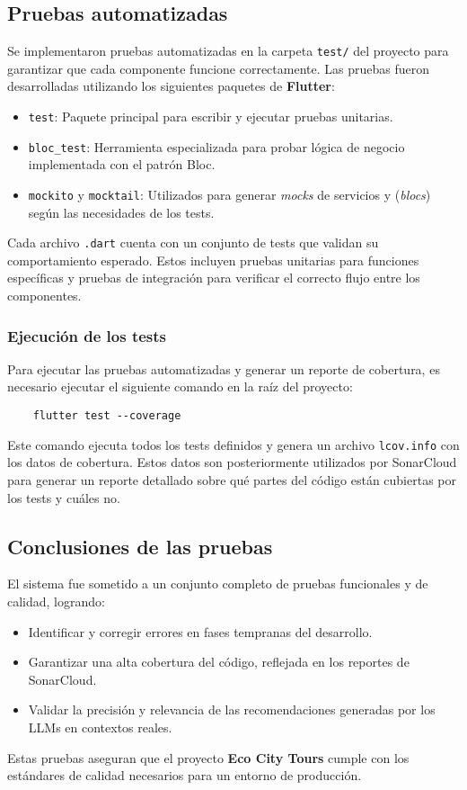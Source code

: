 \subsection{Pruebas automatizadas}

Se implementaron pruebas automatizadas en la carpeta \texttt{test/} del proyecto para garantizar que cada componente funcione correctamente. Las pruebas fueron desarrolladas utilizando los siguientes paquetes de \textbf{Flutter}:

\begin{itemize}
	\item \texttt{test}: Paquete principal para escribir y ejecutar pruebas unitarias.
	\item \texttt{bloc\_test}: Herramienta especializada para probar lógica de negocio implementada con el patrón Bloc.
	\item \texttt{mockito} y \texttt{mocktail}: Utilizados para generar \textit{mocks} de servicios y (\textit{blocs}) según las necesidades de los tests.
\end{itemize}

Cada archivo \texttt{.dart} cuenta con un conjunto de tests que validan su comportamiento esperado. Estos incluyen pruebas unitarias para funciones específicas y pruebas de integración para verificar el correcto flujo entre los componentes.

\subsubsection{Ejecución de los tests}

Para ejecutar las pruebas automatizadas y generar un reporte de cobertura, es necesario ejecutar el siguiente comando en la raíz del proyecto:
\begin{verbatim}
	flutter test --coverage
\end{verbatim}

Este comando ejecuta todos los tests definidos y genera un archivo \texttt{lcov.info} con los datos de cobertura. Estos datos son posteriormente utilizados por SonarCloud para generar un reporte detallado sobre qué partes del código están cubiertas por los tests y cuáles no.

\subsection{Conclusiones de las pruebas}

El sistema fue sometido a un conjunto completo de pruebas funcionales y de calidad, logrando:
\begin{itemize}
	\item Identificar y corregir errores en fases tempranas del desarrollo.
	\item Garantizar una alta cobertura del código, reflejada en los reportes de SonarCloud.
	\item Validar la precisión y relevancia de las recomendaciones generadas por los LLMs en contextos reales.
\end{itemize}

Estas pruebas aseguran que el proyecto \textbf{Eco City Tours} cumple con los estándares de calidad necesarios para un entorno de producción.
